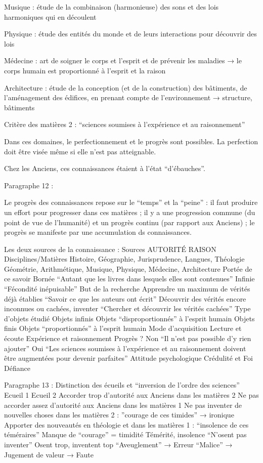 \documentclass[french]{book}
\theoremstyle{definition}
\begin{document}
Musique : étude de la combinaison (harmonieuse) des sons et des lois harmoniques qui en découlent

Physique : étude des entités du monde et de leurs interactions pour découvrir des lois

Médecine : art de soigner le corps et l’esprit et de prévenir les maladies → le corps humain est proportionné à l’esprit et la raison

Architecture : étude de la conception (et de la construction) des bâtiments, de l’aménagement des édifices, en prenant compte de l'environnement → structure, bâtiments

Critère des matières 2 : “sciences soumises à l’expérience et au raisonnement” 

Dans ces domaines, le perfectionnement et le progrès sont possibles. La perfection doit être visée même si elle n’est pas atteignable.

Chez les Anciens, ces connaissances étaient à l’état “d'ébauches”.

Paragraphe 12 :

Le progrès des connaissances repose sur le “temps” et la “peine” : il faut produire un effort pour progresser dans ces matières ; il y a une progression commune (du point de vue de l’humanité) et un progrès continu (par rapport aux Anciens) ;  le progrès se manifeste par une accumulation ds connaissances.

Les deux sources de la connaissance :
Sources
AUTORITÉ
RAISON
Disciplines/Matières
Histoire, Géographie, Jurisprudence, Langues, Théologie
Géométrie, Arithmétique, Musique, Physique, Médecine, Architecture
Portée de ce savoir
Bornée
“Autant que les livres dans lesquels elles sont contenues”
Infinie
“Fécondité inépuisable”
But de la recherche
Apprendre un maximum de vérités déjà établies
“Savoir ce que les auteurs ont écrit”
Découvrir des vérités encore inconnues ou cachées, inventer
“Chercher et découvrir les vérités cachées”
Type d’objets étudié
Objets infinis
Objets “disproportionnés” à l’esprit humain
Objets finis
Objets “proportionnés” à l’esprit humain
Mode d’acquisition
Lecture et écoute
Expérience et raisonnement
Progrès ?
Non
“Il n’est pas possible d’y rien ajouter”
Oui
“Les sciences soumises à l’expérience et au raisonnement doivent être augmentées pour devenir parfaites”
Attitude psychologique
Crédulité et Foi
Défiance



Paragraphe 13 : Distinction des écueils et “inversion de l’ordre des sciences”
Ecueil 1
Ecueil 2
Accorder trop d’autorité aux Anciens dans les matières 2
Ne pas accorder assez d’autorité aux Anciens dans les matières 1
Ne pas inventer de nouvelles choses dans les matières 2 : ”courage de ces timides” → ironique
Apporter des nouveautés en théologie et dans les matières 1 : “insolence de ces téméraires”
Manque de “courage” = timidité
Témérité, insolence
“N’osent pas inventer”
Osent trop, inventent top
“Aveuglement” → Erreur
“Malice” → Jugement de valeur → Faute
\end{document}
